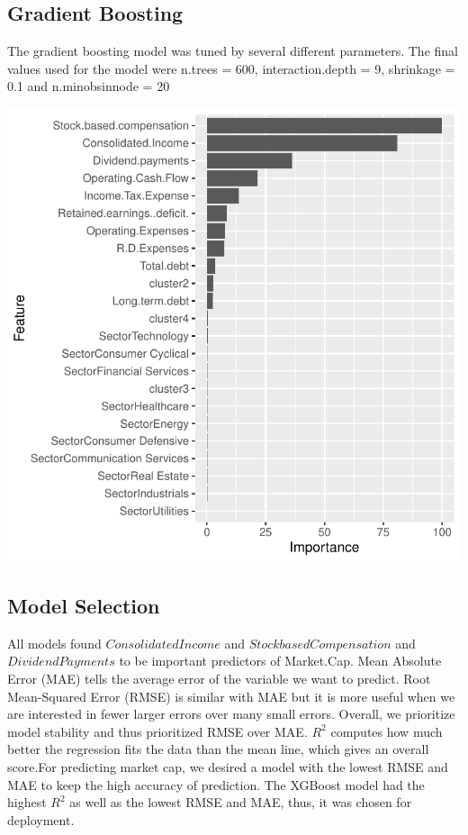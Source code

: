 \documentclass[11pt,]{article}
\begin{document}
\hypertarget{gradient-boosting}{%
\subsection{Gradient Boosting}\label{gradient-boosting}}

The gradient boosting model was tuned by several different parameters.
The final values used for the model were n.trees = 600,
interaction.depth = 9, shrinkage = 0.1 and n.minobsinnode = 20

\begin{center}\includegraphics{stock_analysis_files/figure-latex/gradient boosting-1} \end{center}

\hypertarget{model-selection}{%
\subsection{Model Selection}\label{model-selection}}

All models found \(Consolidated Income\) and
\(Stock based Compensation\) and \(Dividend Payments\) to be important
predictors of Market.Cap. Mean Absolute Error (MAE) tells the average
error of the variable we want to predict. Root Mean-Squared Error (RMSE)
is similar with MAE but it is more useful when we are interested in
fewer larger errors over many small errors. Overall, we prioritize model
stability and thus prioritized RMSE over MAE. \(R^2\) computes how much
better the regression fits the data than the mean line, which gives an
overall score.For predicting market cap, we desired a model with the
lowest RMSE and MAE to keep the high accuracy of prediction. The XGBoost
model had the highest \(R^2\) as well as the lowest RMSE and MAE, thus,
it was chosen for deployment.
\end{document}
